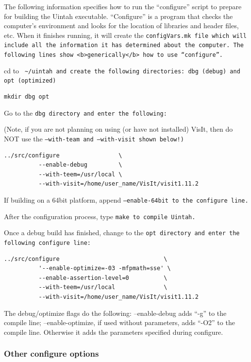 \documentclass[12pt]{article}
\newcommand{\TT}[1]{\tt{#1} \normalfont}
\begin{document}
The following information specifies how to run the ``configure''
script to prepare for building the Uintah executable.  ``Configure''
is a program that checks the computer's environment and looks for the
location of libraries and header files, etc.  When it finishes
running, it will create the \TT{configVars.mk} file which will include all
the information it has determined about the computer.  The following
lines show <b>generically</b> how to use ``configure''.

cd to \TT{ \textasciitilde/uintah} and create the following directories:
\TT{dbg} (debug) and \TT{opt} (optimized)

\begin{verbatim}
mkdir dbg opt
\end{verbatim}

Go to the \TT{dbg} directory and enter the following:

(Note, if you are not planning on using (or have not installed) VisIt,
then do NOT use the \TT{--with-team} and \TT{--with-visit} shown below!)

\begin{verbatim}
../src/configure                 \
          --enable-debug         \
          --with-teem=/usr/local \
          --with-visit=/home/user_name/VisIt/visit1.11.2
\end{verbatim}

If building on a 64bit platform, append \TT{--enable-64bit} to the
configure line.

After the configuration process, type \TT{make} to compile Uintah.

Once a debug build has finished, change to the \TT{opt} directory and
enter the following configure line:

\begin{verbatim}
../src/configure                              \
          '--enable-optimize=-03 -mfpmath=sse' \
          --enable-assertion-level=0          \
          --with-teem=/usr/local              \
          --with-visit=/home/user_name/VisIt/visit1.11.2
\end{verbatim}

The debug/optimize flags do the following:  --enable-debug adds ``-g''
to the compile line; --enable-optimize, if used without parameters,
adds ``-O2'' to the compile line.  Otherwise it adds the parameters
specified during configure.

\subsubsection{Other configure options}
\end{document}
